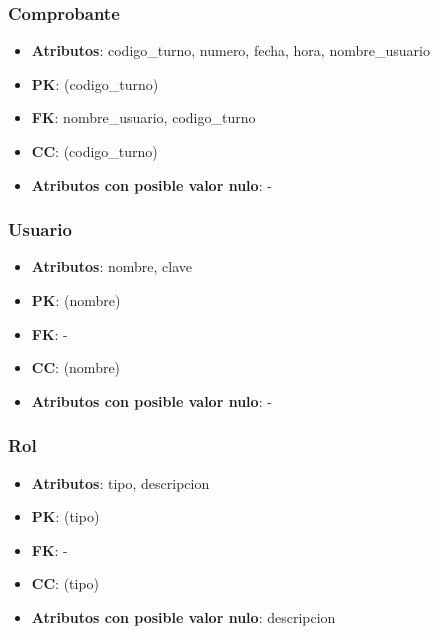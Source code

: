 \documentclass[a4paper,11pt]{article}
\begin{document}
\subsubsection{\textbf{Comprobante}}

\begin{itemize}

\item 
\textbf{Atributos}: codigo\_turno, numero, fecha, hora, nombre\_usuario

\item 
\textbf{PK}: (codigo\_turno)

\item
\textbf{FK}:  nombre\_usuario, codigo\_turno

\item 
\textbf{CC}: (codigo\_turno)

\item 
\textbf{Atributos con posible valor nulo}: -

\end{itemize}
\subsubsection{\textbf{Usuario}}

\begin{itemize}

\item 
\textbf{Atributos}: nombre, clave

\item 
\textbf{PK}: (nombre)

\item
\textbf{FK}: - 

\item 
\textbf{CC}: (nombre)

\item 
\textbf{Atributos con posible valor nulo}: -
\end{itemize}
\subsubsection{\textbf{Rol}}

\begin{itemize}

\item 
\textbf{Atributos}: tipo, descripcion

\item 
\textbf{PK}: (tipo)

\item
\textbf{FK}: - 

\item 
\textbf{CC}: (tipo)

\item 
\textbf{Atributos con posible valor nulo}: descripcion

\end{itemize}
\end{document}
